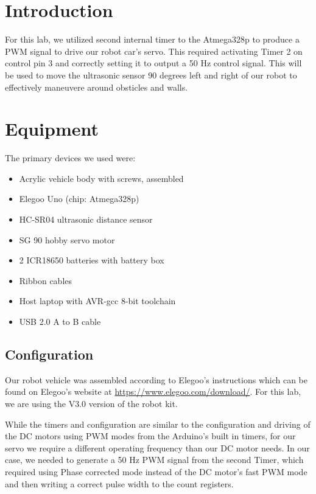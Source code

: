 \documentclass[letterpaper,11pt]{texMemo} %
\begin{document}
\maketitle %


\section*{Introduction}
For this lab, we utilized second internal timer to the Atmega328p to produce a PWM signal
to drive our robot car's servo. This required activating Timer 2 on control pin 3 and 
correctly setting it to output a 50 Hz control signal. This will be used to move the 
ultrasonic sensor 90 degrees left and right of our robot to effectively maneuvere around 
obsticles and walls.

\section*{Equipment}
The primary devices we used were:

\begin{itemize}
    \item Acrylic vehicle body with screws, assembled
    \item Elegoo Uno (chip: Atmega328p)
    \item HC-SR04 ultrasonic distance sensor
    \item SG 90 hobby servo motor
    \item 2 ICR18650 batteries with battery box
    \item Ribbon cables
    \item Host laptop with AVR-gcc 8-bit toolchain
    \item USB 2.0 A to B cable
\end{itemize}

\subsection*{Configuration}
Our robot vehicle was assembled according to Elegoo's instructions which can be found
on Elegoo's website at \url{https://www.elegoo.com/download/}. For this lab, we are
using the V3.0 version of the robot kit.

While the timers and configuration are similar to the configuration and driving of the 
DC motors using PWM modes from the Arduino's built in timers, for our servo we require a 
different operating frequency than our DC motor needs. In our case, we needed to generate 
a 50 Hz PWM signal from the second Timer, which required using Phase corrected mode instead 
of the DC motor's fast PWM mode and then writing a correct pulse width to the count registers.
\end{document}
